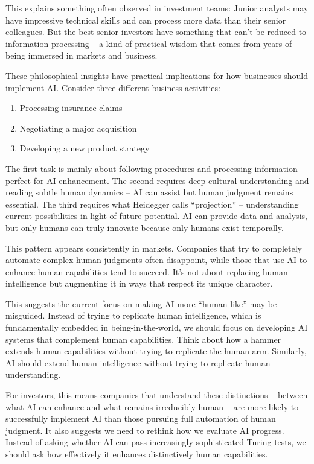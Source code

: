 \documentclass[
  Letterpaper,
]{scrbook}
\providecommand{\tightlist}{%
  \setlength{\itemsep}{0pt}\setlength{\parskip}{0pt}}\usepackage{longtable,booktabs,array}
\begin{document}
This explains something often observed in investment teams: Junior
analysts may have impressive technical skills and can process more data
than their senior colleagues. But the best senior investors have
something that can't be reduced to information processing -- a kind of
practical wisdom that comes from years of being immersed in markets and
business.

These philosophical insights have practical implications for how
businesses should implement AI. Consider three different business
activities:

\begin{enumerate}
\def\labelenumi{\arabic{enumi}.}
\tightlist
\item
  Processing insurance claims
\item
  Negotiating a major acquisition
\item
  Developing a new product strategy
\end{enumerate}

The first task is mainly about following procedures and processing
information -- perfect for AI enhancement. The second requires deep
cultural understanding and reading subtle human dynamics -- AI can
assist but human judgment remains essential. The third requires what
Heidegger calls ``projection'' -- understanding current possibilities in
light of future potential. AI can provide data and analysis, but only
humans can truly innovate because only humans exist temporally.

This pattern appears consistently in markets. Companies that try to
completely automate complex human judgments often disappoint, while
those that use AI to enhance human capabilities tend to succeed. It's
not about replacing human intelligence but augmenting it in ways that
respect its unique character.

This suggests the current focus on making AI more ``human-like'' may be
misguided. Instead of trying to replicate human intelligence, which is
fundamentally embedded in being-in-the-world, we should focus on
developing AI systems that complement human capabilities. Think about
how a hammer extends human capabilities without trying to replicate the
human arm. Similarly, AI should extend human intelligence without trying
to replicate human understanding.

For investors, this means companies that understand these distinctions
-- between what AI can enhance and what remains irreducibly human -- are
more likely to successfully implement AI than those pursuing full
automation of human judgment. It also suggests we need to rethink how we
evaluate AI progress. Instead of asking whether AI can pass increasingly
sophisticated Turing tests, we should ask how effectively it enhances
distinctively human capabilities.
\end{document}
